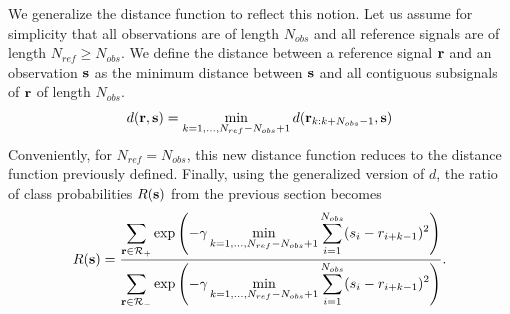We generalize the distance function to reflect this
notion. Let us assume for simplicity that all observations are of length $N_{obs}$ and
all reference signals are of length $N_{ref} \geq N_{obs}$. We define the distance between a
reference signal $\mathbf r$ and an observation $\mathbf s$ as the minimum distance
between $\mathbf s$ and all contiguous subsignals of $\mathbf r$ of length $N_{obs}$.
\begin{gather}
d(\mathbf r, \mathbf s) = \min_{k = 1, \dots, N_{ref} - N_{obs} + 1} d(\mathbf r_{k:k+N_{obs}-1}, \mathbf s)
\end{gather}
Conveniently, for $N_{ref} = N_{obs}$, this new distance function reduces to the distance
function previously defined. Finally, using the generalized version of $d$, the ratio of
class probabilities $R(\mathbf s)$ from the previous section becomes
\begin{gather}
R(\mathbf s) = \frac{\displaystyle \sum_{\mathbf r \in \mathcal{R}_+} \exp \left(-\gamma \displaystyle \min_{k = 1, \dots, N_{ref} - N_{obs} + 1} \displaystyle \sum_{i=1}^{N_{obs}} (s_i - r_{i + k - 1})^2\right)}{\displaystyle \sum_{\mathbf r \in \mathcal{R}_-} \exp \left(-\gamma \displaystyle \min_{k=1,\dots,N_{ref}-N_{obs}+1} \displaystyle \sum_{i=1}^{N_{obs}} (s_i - r_{i + k - 1})^2\right)}.
\end{gather}

